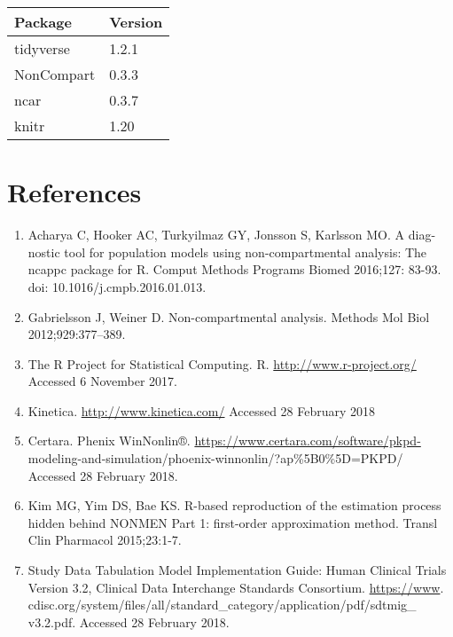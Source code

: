 \documentclass[12pt,]{krantz}
\providecommand{\tightlist}{%
  \setlength{\itemsep}{0pt}\setlength{\parskip}{0pt}}
\theoremstyle{definition}
\theoremstyle{definition}
\theoremstyle{definition}
\theoremstyle{remark}
\begin{document}
\begin{tabular}{ll}
\toprule
Package & Version\\
\midrule
tidyverse & 1.2.1\\
NonCompart & 0.3.3\\
ncar & 0.3.7\\
knitr & 1.20\\
\bottomrule
\end{tabular}

\chapter{References}\label{references}

\begin{enumerate}
\def\labelenumi{\arabic{enumi}.}
\tightlist
\item
  Acharya C, Hooker AC, Turkyilmaz GY, Jonsson S, Karlsson MO. A diag-
  nostic tool for population models using non-compartmental analysis:
  The ncappc package for R. Comput Methods Programs Biomed 2016;127:
  83-93. doi: 10.1016/j.cmpb.2016.01.013.
\item
  Gabrielsson J, Weiner D. Non-compartmental analysis. Methods Mol Biol
  2012;929:377--389.
\item
  The R Project for Statistical Computing. R.
  \url{http://www.r-project.org/} Accessed 6 November 2017.
\item
  Kinetica. \url{http://www.kinetica.com/} Accessed 28 February 2018
\item
  Certara. Phenix WinNonlin®.
  \url{https://www.certara.com/software/pkpd-}
  modeling-and-simulation/phoenix-winnonlin/?ap\%5B0\%5D=PKPD/ Accessed
  28 February 2018.
\item
  Kim MG, Yim DS, Bae KS. R-based reproduction of the estimation process
  hidden behind NONMEN Part 1: first-order approximation method. Transl
  Clin Pharmacol 2015;23:1-7.
\item
  Study Data Tabulation Model Implementation Guide: Human Clinical
  Trials Version 3.2, Clinical Data Interchange Standards Consortium.
  \url{https://www}.
  cdisc.org/system/files/all/standard\_category/application/pdf/sdtmig\_
  v3.2.pdf. Accessed 28 February 2018.
\end{enumerate}


\end{document}
